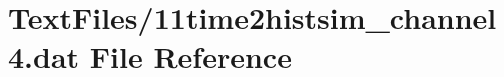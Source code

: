 \hypertarget{11time2histsim__channel4_8dat}{}\section{Text\+Files/11time2histsim\+\_\+channel4.dat File Reference}
\label{11time2histsim__channel4_8dat}
